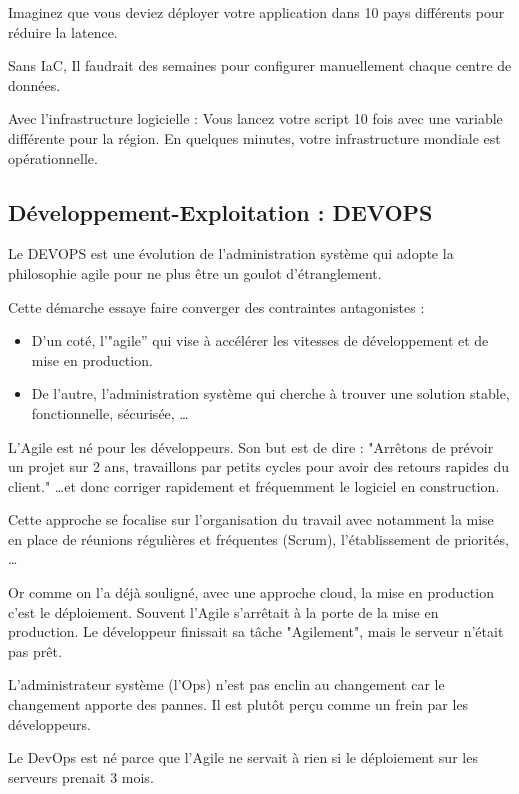 \documentclass{report} %
\begin{document}
  Imaginez que vous deviez déployer votre application dans 10 pays
  différents pour réduire la latence.

  Sans IaC, Il faudrait des semaines pour configurer manuellement
  chaque centre de données.

  Avec l'infrastructure logicielle : Vous lancez votre script 10 fois
  avec une variable différente pour la région. En quelques minutes,
  votre infrastructure mondiale est opérationnelle.

\subsection{Développement-Exploitation :  DEVOPS}

Le DEVOPS est une évolution de l'administration système qui adopte la
philosophie agile pour ne plus être un goulot d'étranglement.

Cette démarche essaye faire converger des contraintes antagonistes :
\begin{itemize}
\item D'un coté, l'"agile'' qui vise à accélérer les vitesses de
  développement et de mise en production.
\item De l'autre, l'administration système qui cherche à trouver une
  solution stable, fonctionnelle, sécurisée, \ldots
\end{itemize}

L'Agile est né pour les développeurs. Son but est de dire : "Arrêtons
de prévoir un projet sur 2 ans, travaillons par petits cycles pour
avoir des retours rapides du client." \ldots et donc corriger
rapidement et fréquemment le logiciel en construction.

Cette approche se focalise sur l'organisation du travail avec
notamment la mise en place de réunions régulières et fréquentes
(Scrum), l'établissement de priorités, \ldots

Or comme on l'a déjà souligné, avec une approche cloud, la mise en
production c'est le déploiement. Souvent l'Agile s'arrêtait
à la porte de la mise en production. Le développeur finissait sa tâche
"Agilement", mais le serveur n'était pas prêt.

L'administrateur système (l'Ops) n'est pas enclin au changement car le
changement apporte des pannes. Il est plutôt perçu comme un frein par les
développeurs.

Le DevOps est né parce que l'Agile ne servait à rien si le déploiement
sur les serveurs prenait 3 mois.
\end{document}
